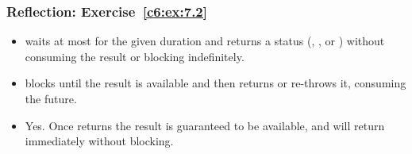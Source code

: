 \subsubsection{Reflection: Exercise~\ref{c6:ex:7.2}}
\begin{itemize}
  \item {} waits at most for the given duration and returns a status
    (, , or ) without consuming the result or blocking
    indefinitely.
  \item {} blocks until the result is available and then returns or re-throws it,
    consuming the future.
\end{itemize}

\begin{itemize}
  \item Yes. Once  returns  the result is
    guaranteed to be available, and  will return immediately without blocking.
\end{itemize}
